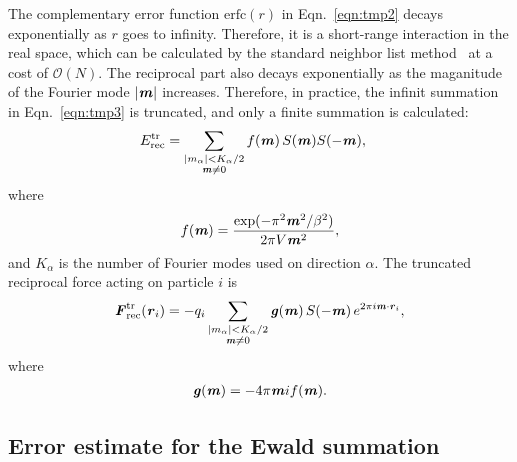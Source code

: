 \documentclass[aps,pre,preprint]{revtex4}
\renewcommand{\v}[1]{\textbf{\textit{#1}}}
\begin{document}
The complementary error function $\textrm{erfc}(r)$ in
Eqn.~\eqref{eqn:tmp2} decays exponentially as $r$ goes to infinity.
Therefore, it is a short-range interaction in the real space, which
can be calculated by the standard neighbor list
method~\cite{frenkel02b} at a cost of $\mathcal O(N)$.  The reciprocal
part also decays exponentially as the maganitude of the Fourier mode
$\vert\v m\vert$ increases. Therefore, in practice, the infinit
summation in Eqn.~\eqref{eqn:tmp3} is truncated, and only a finite
summation is calculated:
\begin{align}\label{eqn:tmp6}
  E^{\textrm{tr}}_{\textrm{rec}} & =
  \sum_{
    \begin{subarray}{c}
      \vert m_\alpha\vert < K_\alpha/2\\
      \v m\neq 0
    \end{subarray}}
  f(\v m)\, S(\v m) S(-\v m),
\end{align}
where
\begin{align}
  f(\v m) = \frac{\exp(-\pi^2 \v m^2 / \beta^2)}{2\pi V \v m^2},
\end{align}
and $K_\alpha$ is the number of Fourier modes used on direction
$\alpha$.  The truncated reciprocal force acting on particle $i$ is
\begin{align}\label{eqn:tmp8}
  \v F^{\textrm{tr}}_{\textrm{rec}}(\v r_i) = - 
  q_i 
  \sum_{
    \begin{subarray}{c}
      \vert m_\alpha\vert < K_\alpha/2\\
      \v m\neq 0
    \end{subarray}}
  \v g(\v m) \,
  S(-\v m)\,
  e^{2\pi i\v m\cdot\v r_i},
\end{align}
where
\begin{align}
  \v g(\v m) = -4 \pi \v m i f(\v m).
\end{align}



\subsection{Error estimate for the Ewald summation}
\end{document}
